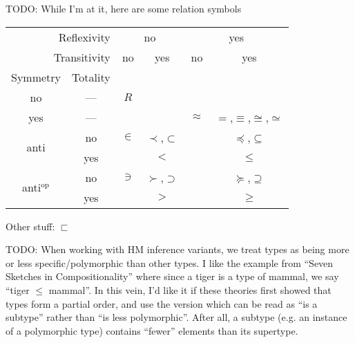 \documentclass[11pt]{article} %
\theoremstyle{definition}
\theoremstyle{remark}
\begin{document}
TODO: While I'm at it, here are some relation symbols
\begin{center}
\begin{tabular}{cc|cccc}
\multicolumn{2}{r|}{Reflexivity}     & \multicolumn{2}{c}{no} & \multicolumn{2}{c}{yes} \\
\multicolumn{2}{r|}{Transitivity} & no & yes & no & yes \\
Symmetry & Totality \\
\hline
no & --- & $R$ \\
yes & --- &  & & $\approx$ & $=$,$\equiv$,$\cong$,$\simeq$  \\
\multirow{2}{*}{anti} & no & $\in$ & $\prec$,$\subset$ & & $\preceq$,$\subseteq$ \\
 & yes                    & & $<$ & & $\leq$ \\
\multirow{2}{*}{anti$^\text{op}$} & no & $\ni$ & $\succ$,$\supset$ & & $\succeq$,$\supseteq$ \\
 & yes                    & & $>$ & & $\geq$ \\
\end{tabular}
\end{center}
Other stuff: $\sqsubset$

TODO:
When working with HM inference variants, we treat types as being more or less specific/polymorphic than other types.
I like the example from ``Seven Sketches in Compositionality'' where since a tiger is a type of mammal, we say ``tiger $\leq$ mammal''.
In this vein, I'd like it if these theories first showed that types form a partial order, and use the version which can be read as ``is a subtype'' rather than ``is less polymorphic''.
After all, a subtype (e.g. an instance of a polymorphic type) contains ``fewer'' elements than its supertype.
\end{document}
